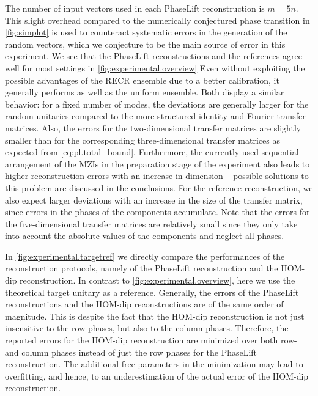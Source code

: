 The number of input vectors used in each PhaseLift reconstruction is $m = 5n$.
This slight overhead compared to the numerically conjectured phase transition in \cref{fig:simplot} is used to counteract systematic errors in the generation of the random vectors, which we conjecture to be the main source of error in this experiment.
We see that the PhaseLift reconstructions and the references agree well for most settings in \cref{fig:experimental.overview}
Even without exploiting the possible advantages of the RECR ensemble due to a better calibration, it generally performs as well as the uniform ensemble.
Both display a similar behavior: for a fixed number of modes, the deviations are generally larger for the random unitaries compared to the more structured identity and Fourier transfer matrices.
Also, the errors for the two-dimensional transfer matrices are slightly smaller than for the corresponding three-dimensional transfer matrices as expected from \cref{eq:pl.total_bound}.
Furthermore, the currently used sequential arrangement of the MZIs in the preparation stage of the experiment also leads to higher reconstruction errors with an increase in dimension -- possible solutions to this problem are discussed in the conclusions.
For the reference reconstruction, we also expect larger deviations with an increase in the size of the transfer matrix, since errors in the phases of the components accumulate.
Note that the errors for the five-dimensional transfer matrices are relatively small since they only take into account the absolute values of the components and neglect all phases.

In \cref{fig:experimental.targetref} we directly compare the performances of the reconstruction protocols, namely of the PhaseLift reconstruction and the HOM-dip reconstruction.
In contrast to \cref{fig:experimental.overview}, here we use the theoretical target unitary as a reference.
Generally, the errors of the PhaseLift reconstructions and the HOM-dip reconstructions are of the same order of magnitude.
This is despite the fact that the HOM-dip reconstruction is not just insensitive to the row phases, but also to the column phases.
Therefore, the reported errors for the HOM-dip reconstruction are minimized over both row- and column phases instead of just the row phases for the PhaseLift reconstruction.
The additional free parameters in the minimization may lead to overfitting, and hence, to an underestimation of the actual error of the HOM-dip reconstruction.


